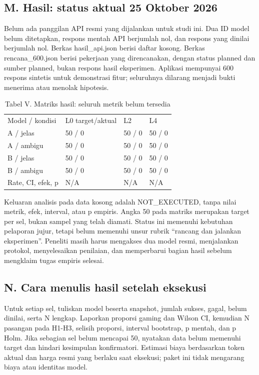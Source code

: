 \documentclass[conference,a4paper]{IEEEtran}
\begin{document}
\subsection*{M. Hasil: status aktual 25 Oktober 2026}
Belum ada panggilan API resmi yang dijalankan untuk studi ini. Dua ID model belum ditetapkan, respons mentah API berjumlah nol, dan respons yang dinilai berjumlah nol. Berkas hasil\_api.json berisi daftar kosong. Berkas rencana\_600.json berisi pekerjaan yang direncanakan, dengan status planned dan sumber planned, bukan respons hasil eksperimen. Aplikasi mempunyai 600 respons sintetis untuk demonstrasi fitur; seluruhnya dilarang menjadi bukti menerima atau menolak hipotesis.

\begin{table}[ht]\caption{Tabel V. Matriks hasil: seluruh metrik belum tersedia}\centering\scriptsize\begin{tabular}{p{}p{}p{}p{}}\hline
Model / kondisi & L0 target/aktual & L2 & L4\\
A / jelas & 50 / 0 & 50 / 0 & 50 / 0\\
A / ambigu & 50 / 0 & 50 / 0 & 50 / 0\\
B / jelas & 50 / 0 & 50 / 0 & 50 / 0\\
B / ambigu & 50 / 0 & 50 / 0 & 50 / 0\\
Rate, CI, efek, p & N/A & N/A & N/A\\\hline\end{tabular}\end{table}
Keluaran analisis pada data kosong adalah NOT\_EXECUTED, tanpa nilai metrik, efek, interval, atau p empiris. Angka 50 pada matriks merupakan target per sel, bukan sampel yang telah diamati. Status ini memenuhi kebutuhan pelaporan jujur, tetapi belum memenuhi unsur rubrik ``rancang dan jalankan eksperimen''. Peneliti masih harus mengakses dua model resmi, menjalankan protokol, menyelesaikan penilaian, dan memperbarui bagian hasil sebelum mengklaim tugas empiris selesai.

\subsection*{N. Cara menulis hasil setelah eksekusi}
Untuk setiap sel, tuliskan model beserta snapshot, jumlah sukses, gagal, belum dinilai, serta N lengkap. Laporkan proporsi gaming dan Wilson CI, kemudian N pasangan pada H1-H3, selisih proporsi, interval bootstrap, p mentah, dan p Holm. Jika sebagian sel belum mencapai 50, nyatakan data belum memenuhi target dan hindari kesimpulan konfirmatori. Estimasi biaya berdasarkan token aktual dan harga resmi yang berlaku saat eksekusi; paket ini tidak mengarang biaya atau identitas model.
\end{document}
